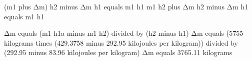 (m1 plus Δm) h2 minus Δm h1 equals m1 h1  
m1 h2 plus Δm h2 minus Δm h1 equals m1 h1  

Δm equals (m1 h1a minus m1 h2) divided by (h2 minus h1)  
Δm equals (5755 kilograms times (429.3758 minus 292.95 kilojoules per kilogram)) divided by (292.95 minus 83.96 kilojoules per kilogram)  
Δm equals 3765.11 kilograms